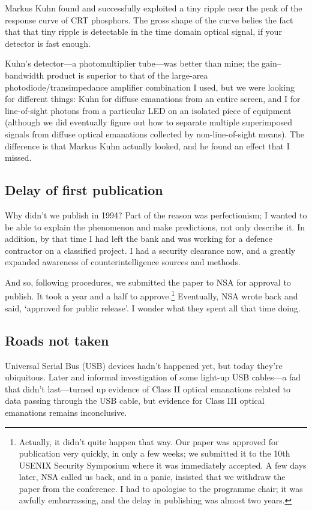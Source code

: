 \documentclass[conference]{IEEEtran}
\begin{document}
Markus Kuhn found and successfully exploited a tiny ripple near the peak of
the response curve of CRT phosphors. The gross shape of the curve belies the
fact that that tiny ripple is detectable in the time domain optical signal,
if your detector is fast enough.

Kuhn's detector---a photomultiplier tube---was better than mine; the
gain--bandwidth product is superior to that of the large-area
photodiode/transimpedance amplifier combination I used, but we were looking
for different things: Kuhn for diffuse emanations from an entire screen, and
I for line-of-sight photons from a particular LED on an isolated piece of
equipment (although we did eventually figure out how to separate multiple
superimposed signals from diffuse optical emanations collected by
non-line-of-sight means). The difference is that Markus Kuhn actually looked,
and he found an effect that I missed.

\subsection{Delay of first publication}

Why didn't we publish in 1994? Part of the reason was perfectionism; I wanted
to be able to explain the phenomenon and make predictions, not only describe
it. In addition, by that time I had left the bank and was working for a
defence contractor on a classified project. I had a security clearance now,
and a greatly expanded awareness of counterintelligence sources and methods.

And so, following procedures, we submitted the paper to NSA for approval to
publish. It took a year and a half to approve.\footnote{Actually, it didn't
quite happen that way. Our paper was approved for publication very quickly,
in only a few weeks; we submitted it to the 10th USENIX Security Symposium
where it was immediately accepted. A few days later, NSA called us back, and
in a panic, insisted that we withdraw the paper from the conference. I had to
apologise to the programme chair; it was awfully embarrassing, and the delay
in publishing was almost two years.} Eventually, NSA wrote back and said,
`approved for public release'. I wonder what they spent all that time doing.

\subsection{Roads not taken}

Universal Serial Bus (USB) devices hadn't happened yet, but today they're
ubiquitous. Later and informal investigation of some light-up USB cables---a
fad that didn't last---turned up evidence of Class II optical emanations
related to data passing through the USB cable, but evidence for Class III
optical emanations remains inconclusive.
\end{document}
